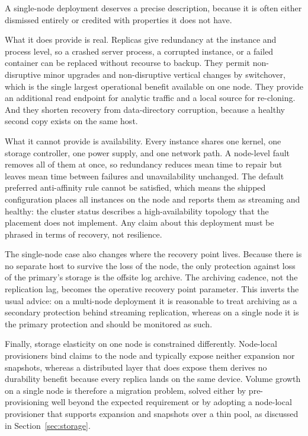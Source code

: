 \documentclass[11pt,a4paper]{article}
\begin{document}
A single-node deployment deserves a precise description, because it is often either dismissed entirely or credited with properties it does not have.

What it does provide is real. Replicas give redundancy at the instance and process level, so a crashed server process, a corrupted instance, or a failed container can be replaced without recourse to backup. They permit non-disruptive minor upgrades and non-disruptive vertical changes by switchover, which is the single largest operational benefit available on one node. They provide an additional read endpoint for analytic traffic and a local source for re-cloning. And they shorten recovery from data-directory corruption, because a healthy second copy exists on the same host.

What it cannot provide is availability. Every instance shares one kernel, one storage controller, one power supply, and one network path. A node-level fault removes all of them at once, so redundancy reduces mean time to repair but leaves mean time between failures and unavailability unchanged. The default preferred anti-affinity rule cannot be satisfied, which means the shipped configuration places all instances on the node and reports them as streaming and healthy: the cluster status describes a high-availability topology that the placement does not implement. Any claim about this deployment must be phrased in terms of recovery, not resilience.

The single-node case also changes where the recovery point lives. Because there is no separate host to survive the loss of the node, the only protection against loss of the primary's storage is the offsite log archive. The archiving cadence, not the replication lag, becomes the operative recovery point parameter. This inverts the usual advice: on a multi-node deployment it is reasonable to treat archiving as a secondary protection behind streaming replication, whereas on a single node it is the primary protection and should be monitored as such.

Finally, storage elasticity on one node is constrained differently. Node-local provisioners bind claims to the node and typically expose neither expansion nor snapshots, whereas a distributed layer that does expose them derives no durability benefit because every replica lands on the same device. Volume growth on a single node is therefore a migration problem, solved either by pre-provisioning well beyond the expected requirement or by adopting a node-local provisioner that supports expansion and snapshots over a thin pool, as discussed in Section~\ref{sec:storage}.
\end{document}
